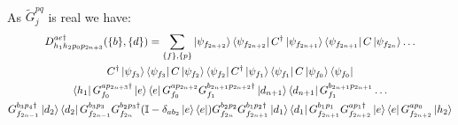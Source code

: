 \documentclass[aps,floatfix,10pt,amssymb,amsfont,amsmath,superscriptaddress,float,nofootinbib,longbibliography,nobalancelastpage,twocolumn]{revtex4-2}
\begin{document}
\begin{widetext}
\begin{multline}
\end{multline}
As $\tilde G_j^{pq}$ is real we have:
\begin{multline}
    D_{h_1h_2p_0p_{2n+3}}^{ae\dagger}(\{b\},\{d\}) = \sum_{\{f\},\{p\}}\ket{\psi_{f_{2n+2}}}\bra{\psi_{f_{2n+2}}}C^{\dagger}\ket{\psi_{f_{2n+1}}}\bra{\psi_{f_{2n+1}}}C\ket{\psi_{f_{2n}}}\ldots \\C^{\dagger}\ket{\psi_{f_3}}\bra{\psi_{f_3}}C\ket{\psi_{f_2}}\bra{\psi_{f_2}}C^{\dagger}\ket{\psi_{f_1}}\bra{\psi_{f_1}}C\ket{\psi_{f_0}}\bra{\psi_{f_0}}
    \\
\bra{h_1}G^{ap_{2n+3}\dagger}_{f_{0}}\ket{e}\bra{e}G^{ap_{2n+2}}_{f_{0}}G^{b_{2n+1}p_{2n+2}\dagger}_{f_{1}}\ket{d_{n+1}}\bra{d_{n+1}}G^{b_{2n+1}p_{2n+1}}_{f_{1}}\ldots\\ G^{b_3p_4\dagger}_{f_{2n-1}}\ket{d_2}\bra{d_2}G^{b_3p_3}_{f_{2n-1}}G^{b_2p_3\dagger}_{f_{2n}}(\mathbb{I} - \delta_{ab_2}\ket{e}\bra{e})G^{b_2p_2}_{f_{2n}}G^{b_1p_2\dagger}_{f_{2n+1}}\ket{d_{1}}\bra{d_1}G^{b_1p_1}_{f_{2n+1}}G^{ap_1\dagger}_{f_{2n+2}}\ket{e}\bra{e}G^{ap_0}_{f_{2n+2}}\ket{h_2}
\end{multline}

\end{widetext}
\end{document}
